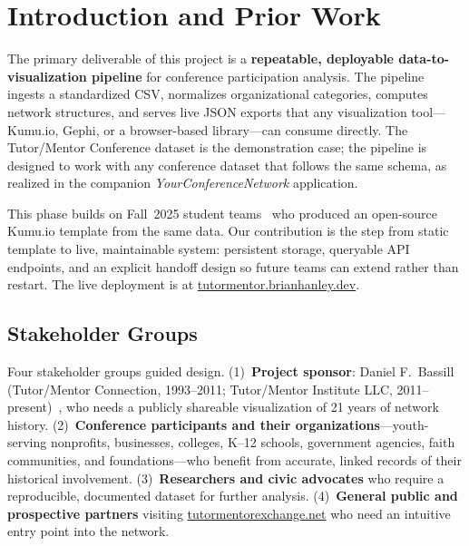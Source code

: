 \documentclass[10pt,twocolumn,letterpaper]{article}
\begin{document}

\section{Introduction and Prior Work}

The primary deliverable of this project is a \textbf{repeatable,
deployable data-to-visualization pipeline} for conference participation
analysis. The pipeline ingests a standardized CSV, normalizes
organizational categories, computes network structures, and serves
live JSON exports that any visualization tool---Kumu.io, Gephi, or a
browser-based library---can consume directly. The
Tutor/Mentor Conference dataset is the demonstration case; the
pipeline is designed to work with any conference dataset that follows
the same schema, as realized in the companion
\textit{YourConferenceNetwork} application.

This phase builds on Fall~2025 student teams~\cite{teamk2025} who
produced an open-source Kumu.io template from the same data. Our
contribution is the step from static template to live, maintainable
system: persistent storage, queryable API endpoints, and an explicit
handoff design so future teams can extend rather than restart.
The live deployment is at
\href{https://tutormentor.brianhanley.dev}{tutormentor.brianhanley.dev}.

\subsection{Stakeholder Groups}

Four stakeholder groups guided design. (1)~\textbf{Project sponsor}:
Daniel F.\ Bassill (Tutor/Mentor Connection, 1993--2011;
Tutor/Mentor Institute LLC, 2011--present)~\cite{bassill2025}, who
needs a publicly shareable visualization of 21 years of network history.
(2)~\textbf{Conference participants and their organizations}---youth-serving
nonprofits, businesses, colleges, K--12 schools, government agencies,
faith communities, and foundations---who benefit from accurate, linked
records of their historical involvement.
(3)~\textbf{Researchers and civic advocates} who require a
reproducible, documented dataset for further analysis.
(4)~\textbf{General public and prospective partners} visiting
\href{https://tutormentorexchange.net}{tutormentorexchange.net} who
need an intuitive entry point into the network.
\end{document}
